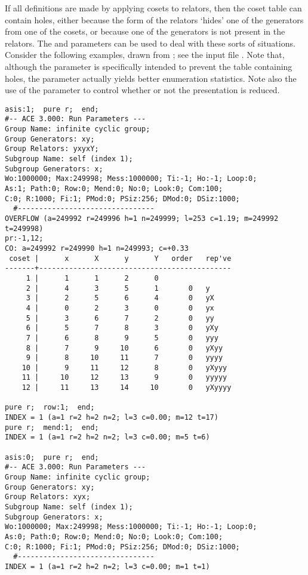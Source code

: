 
If all definitions are made by applying cosets to relators, then the coset
  table can contain holes, either because the form of the relators `hides'
  one of the generators from one of the cosets, or because one of the
  generators is not present in the relators.
The  and  parameters can be used to deal with these
  sorts of situations.
Consider the following examples, drawn from \cite{War}; see the input file
  .
Note that, although the  parameter is specifically intended to
  prevent the table containing holes, the  parameter actually
  yields better enumeration statistics.
Note also the use of the  parameter to control whether or not
  the presentation is reduced.

\bv\begin{verbatim}
asis:1;  pure r;  end;  
#-- ACE 3.000: Run Parameters ---
Group Name: infinite cyclic group;
Group Generators: xy;
Group Relators: yxyxY;
Subgroup Name: self (index 1);
Subgroup Generators: x;
Wo:1000000; Max:249998; Mess:1000000; Ti:-1; Ho:-1; Loop:0;
As:1; Path:0; Row:0; Mend:0; No:0; Look:0; Com:100;
C:0; R:1000; Fi:1; PMod:0; PSiz:256; DMod:0; DSiz:1000;
  #--------------------------------
OVERFLOW (a=249992 r=249996 h=1 n=249999; l=253 c=1.19; m=249992 t=249998)
pr:-1,12;
CO: a=249992 r=249990 h=1 n=249993; c=+0.33
 coset |      x      X      y      Y   order   rep've
-------+---------------------------------------------
     1 |      1      1      2      0
     2 |      4      3      5      1       0   y
     3 |      2      5      6      4       0   yX
     4 |      0      2      3      0       0   yx
     5 |      3      6      7      2       0   yy
     6 |      5      7      8      3       0   yXy
     7 |      6      8      9      5       0   yyy
     8 |      7      9     10      6       0   yXyy
     9 |      8     10     11      7       0   yyyy
    10 |      9     11     12      8       0   yXyyy
    11 |     10     12     13      9       0   yyyyy
    12 |     11     13     14     10       0   yXyyyy

pure r;  row:1;  end;
INDEX = 1 (a=1 r=2 h=2 n=2; l=3 c=0.00; m=12 t=17)
pure r;  mend:1;  end;
INDEX = 1 (a=1 r=2 h=2 n=2; l=3 c=0.00; m=5 t=6)

asis:0;  pure r;  end;  
#-- ACE 3.000: Run Parameters ---
Group Name: infinite cyclic group;
Group Generators: xy;
Group Relators: xyx;
Subgroup Name: self (index 1);
Subgroup Generators: x;
Wo:1000000; Max:249998; Mess:1000000; Ti:-1; Ho:-1; Loop:0;
As:0; Path:0; Row:0; Mend:0; No:0; Look:0; Com:100;
C:0; R:1000; Fi:1; PMod:0; PSiz:256; DMod:0; DSiz:1000;
  #--------------------------------
INDEX = 1 (a=1 r=2 h=2 n=2; l=3 c=0.00; m=1 t=1)


\end{verbatim}
